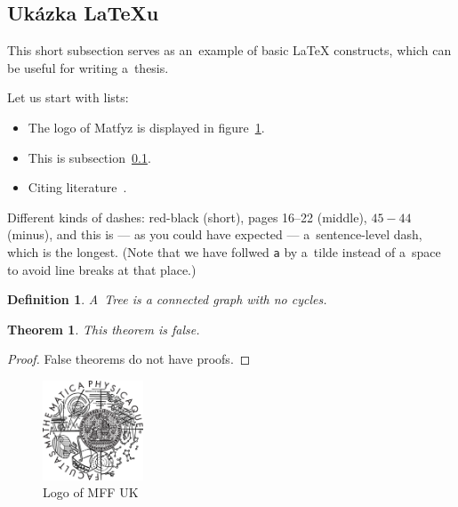 
\subsection{Ukázka \LaTeX{}u}
\label{ssec:ukazka}

This short subsection serves as an~example of basic \LaTeX{} constructs,
which can be useful for writing a~thesis.

Let us start with lists:

\begin{itemize}
\item The logo of Matfyz is displayed in figure~\ref{fig:mff}.
\item This is subsection~\ref{ssec:ukazka}.
\item Citing literature~\cite{lamport94}.
\end{itemize}

Different kinds of dashes:
red-black (short),
pages 16--22 (middle),
$45-44$ (minus),
and this is --- as you could have expected --- a~sentence-level dash,
which is the longest.
(Note that we have follwed \verb|a| by a~tilde instead of a~space
to avoid line breaks at that place.)

\newtheorem{theorem}{Theorem}
\newtheorem*{define}{Definition}	%

\begin{define}
A~{\sl Tree} is a connected graph with no cycles.
\end{define}

\begin{theorem}
This theorem is false.
\end{theorem}

\begin{proof}
False theorems do not have proofs.
\end{proof}

\begin{figure}
	\centering
	\includegraphics[width=30mm]{logo.eps}
	\caption{Logo of MFF UK}
	\label{fig:mff}
\end{figure}

